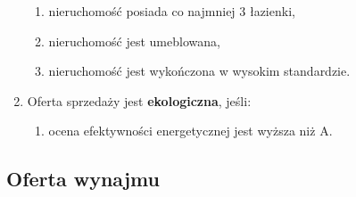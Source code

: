 \begin{enumerate}[label=S\arabic*.]
\begin{enumerate}[label=\arabic*.]
        \item nieruchomość posiada co najmniej 3 łazienki,
        \item nieruchomość jest umeblowana,
        \item nieruchomość jest wykończona w wysokim standardzie.
    \end{enumerate}
    \item Oferta sprzedaży jest \textbf{ekologiczna}, jeśli:
    \begin{enumerate}[label=\arabic*.]
        \item ocena efektywności energetycznej jest wyższa niż A.
    \end{enumerate}
\end{enumerate}

\subsection{Oferta wynajmu}
